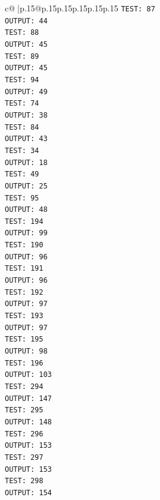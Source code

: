 \documentclass{article}
\begin{document}
{\begin{supertabular}{c@{$\;$}|p{.15\linewidth}@{}p{.15\linewidth}p{.15\linewidth}p{.15\linewidth}p{.15\linewidth}p{.15\linewidth}}
{{{\texttt{TEST: 87} \\
\texttt{OUTPUT: 44} \\
\texttt{TEST: 88} \\
\texttt{OUTPUT: 45} \\
\texttt{TEST: 89} \\
\texttt{OUTPUT: 45} \\
\texttt{TEST: 94} \\
\texttt{OUTPUT: 49} \\
\texttt{TEST: 74} \\
\texttt{OUTPUT: 38} \\
\texttt{TEST: 84} \\
\texttt{OUTPUT: 43} \\
\texttt{TEST: 34} \\
\texttt{OUTPUT: 18} \\
\texttt{TEST: 49} \\
\texttt{OUTPUT: 25} \\
\texttt{TEST: 95} \\
\texttt{OUTPUT: 48} \\
\texttt{TEST: 194} \\
\texttt{OUTPUT: 99} \\
\texttt{TEST: 190} \\
\texttt{OUTPUT: 96} \\
\texttt{TEST: 191} \\
\texttt{OUTPUT: 96} \\
\texttt{TEST: 192} \\
\texttt{OUTPUT: 97} \\
\texttt{TEST: 193} \\
\texttt{OUTPUT: 97} \\
\texttt{TEST: 195} \\
\texttt{OUTPUT: 98} \\
\texttt{TEST: 196} \\
\texttt{OUTPUT: 103} \\
\texttt{TEST: 294} \\
\texttt{OUTPUT: 147} \\
\texttt{TEST: 295} \\
\texttt{OUTPUT: 148} \\
\texttt{TEST: 296} \\
\texttt{OUTPUT: 153} \\
\texttt{TEST: 297} \\
\texttt{OUTPUT: 153} \\
\texttt{TEST: 298} \\
\texttt{OUTPUT: 154} \\
}}}
\end{supertabular}}
\end{document}
